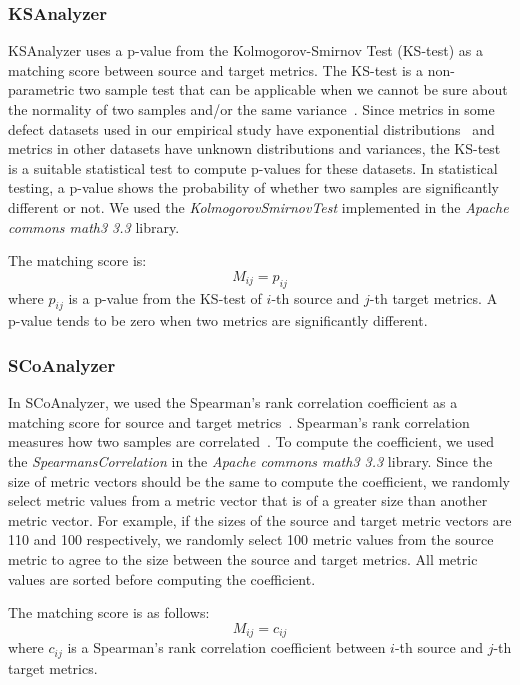 \subsubsection{KSAnalyzer}
KSAnalyzer uses a p-value from the Kolmogorov-Smirnov Test (KS-test)
as a matching score between source and target metrics. The KS-test is a
non-parametric two sample test that can be applicable when we cannot be sure
about the normality of two samples and/or the same
variance~\cite{Lilliefors67,Massey51}. Since metrics in some defect datasets
used in our empirical study have exponential distributions~\cite{Menzies07} and
metrics in other datasets have unknown distributions and variances, the KS-test
is a suitable statistical test to compute p-values for these datasets. In statistical testing, a p-value shows the
probability of whether two samples are significantly different or not. We used
the {\em KolmogorovSmirnovTest} implemented in the {\em Apache commons math3 3.3}
library.


The matching score is:
\begin{equation}M_{ij}=p_{ij}\end{equation}
where $p_{ij}$ is a p-value from the KS-test of $i$-th source and $j$-th
target metrics. A p-value tends to be zero when two metrics are significantly
different.

\subsubsection{SCoAnalyzer}
In SCoAnalyzer, we used the Spearman's
rank correlation coefficient as a matching score for source and target
metrics~\cite{Spearman10}.
Spearman's rank correlation measures how two samples
are correlated~\cite{Spearman10}. To compute the coefficient, we used the
{\em SpearmansCorrelation} in the {\em Apache commons math3 3.3} library. Since the
size of metric vectors should be the same to compute the coefficient, we
randomly select metric values from a metric vector that is of a greater size
than another metric vector. For example, if the sizes of the source and target metric
vectors are 110 and 100 respectively, we randomly select 100 metric values from the
source metric to agree to the size between the source and target metrics. All
metric values are sorted before computing the coefficient.

The matching score is as follows:
\begin{equation}M_{ij}=c_{ij}\end{equation}
where $c_{ij}$ is a Spearman's rank correlation coefficient between $i$-th
source and $j$-th target metrics.

